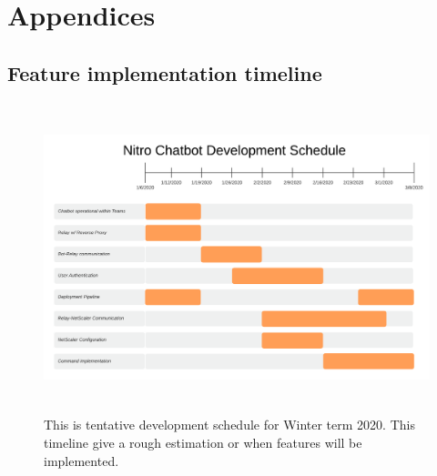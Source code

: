 \documentclass[onecolumn, draftclsnofoot,10pt, compsoc]{IEEEtran}
\begin{document}
\clearpage
\section{Appendices}
\subsection{Feature implementation timeline}
\begin{figure}[h]
    \centering
    \includegraphics[height=9cm]{gantt.png}
    \caption[Feature implementation timeline]{This is tentative development schedule for Winter term 2020. This timeline give a rough estimation or when features will be implemented.}
    \label{fig:Feature implementation Timeline}
\end{figure}

\clearpage


\end{document}
